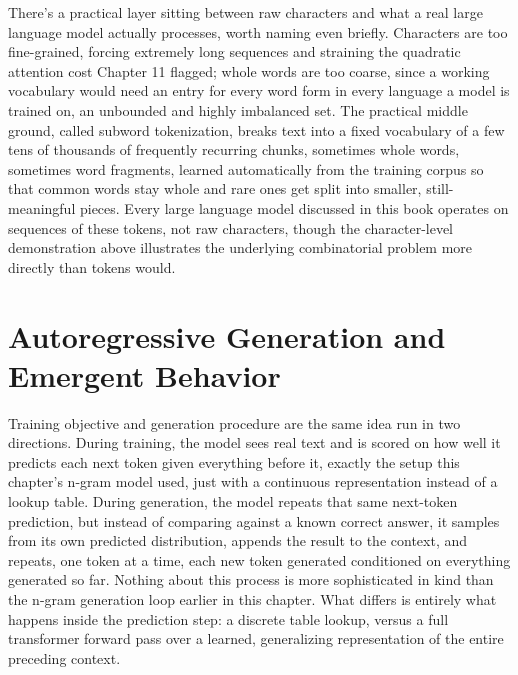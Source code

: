 There's a practical layer sitting between raw characters and what a real large language model actually processes, worth naming even briefly. Characters are too fine-grained, forcing extremely long sequences and straining the quadratic attention cost Chapter 11 flagged; whole words are too coarse, since a working vocabulary would need an entry for every word form in every language a model is trained on, an unbounded and highly imbalanced set. The practical middle ground, called subword tokenization, breaks text into a fixed vocabulary of a few tens of thousands of frequently recurring chunks, sometimes whole words, sometimes word fragments, learned automatically from the training corpus so that common words stay whole and rare ones get split into smaller, still-meaningful pieces. Every large language model discussed in this book operates on sequences of these tokens, not raw characters, though the character-level demonstration above illustrates the underlying combinatorial problem more directly than tokens would.

\section*{Autoregressive Generation and Emergent Behavior}

Training objective and generation procedure are the same idea run in two directions. During training, the model sees real text and is scored on how well it predicts each next token given everything before it, exactly the setup this chapter's n-gram model used, just with a continuous representation instead of a lookup table. During generation, the model repeats that same next-token prediction, but instead of comparing against a known correct answer, it samples from its own predicted distribution, appends the result to the context, and repeats, one token at a time, each new token generated conditioned on everything generated so far. Nothing about this process is more sophisticated in kind than the n-gram generation loop earlier in this chapter. What differs is entirely what happens inside the prediction step: a discrete table lookup, versus a full transformer forward pass over a learned, generalizing representation of the entire preceding context.

